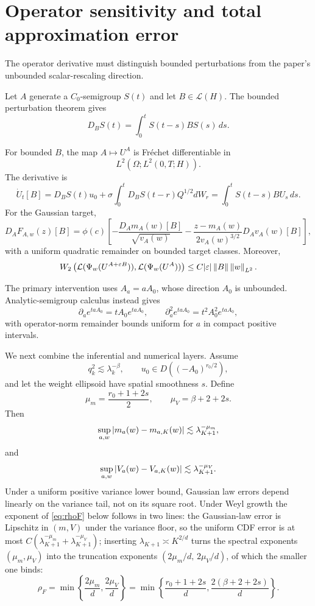 \section{Operator sensitivity and total approximation error}\label{sec:sensitivity}

The operator derivative must distinguish bounded perturbations from the paper's unbounded scalar-rescaling direction.

Let $A$ generate a $C_0$-semigroup $S(t)$ and let $B\in\mathcal L(H)$. The bounded perturbation theorem \citep{EngelNagel2000,Pazy1983} gives
\[
 D_BS(t)=\int_0^tS(t-s)BS(s)\,ds.
\]

\begin{theorem}\label{thm:sensitivity}
For bounded $B$, the map $A\mapsto U^A$ is Fr\'echet differentiable in
\[
 L^2(\Omega;L^2(0,T;H)).
\]
The derivative is
\[
 \dot U_t[B]
 =D_BS(t)u_0
 +\sigma\int_0^tD_BS(t-r)Q^{1/2}dW_r
 =\int_0^tS(t-s)BU_s\,ds.
\]
For the Gaussian target,
\[
 D_AF_{A,w}(z)[B]
 =\phi(c)
 \left[
 -\frac{D_Am_A(w)[B]}{\sqrt{v_A(w)}}
 -\frac{z-m_A(w)}{2v_A(w)^{3/2}}D_Av_A(w)[B]
 \right],
\]
with a uniform quadratic remainder on bounded target classes. Moreover,
\[
 W_2\left(
 \mathcal L(\Psi_w(U^{A+\varepsilon B})),
 \mathcal L(\Psi_w(U^A))
 \right)
 \le C|\varepsilon|\left\lVert B\right\rVert\left\lVert w\right\rVert_{L^2}.
\]
\end{theorem}

The primary intervention uses $A_a=aA_0$, whose direction $A_0$ is unbounded. Analytic-semigroup calculus instead gives
\[
 \partial_a e^{taA_0}=tA_0e^{taA_0},
 \qquad
 \partial_a^2e^{taA_0}=t^2A_0^2e^{taA_0},
\]
with operator-norm remainder bounds uniform for $a$ in compact positive intervals.

We next combine the inferential and numerical layers. Assume
\[
 q_k^2\lesssim\lambda_k^{-\beta},
 \qquad
 u_0\in D((-A_0)^{r_0/2}),
\]
and let the weight ellipsoid have spatial smoothness $s$. Define
\[
 \mu_m=\frac{r_0+1+2s}{2},
 \qquad
 \mu_V=\beta+2+2s.
\]
Then
\[
 \sup_{a,w}\left\lvert m_a(w)-m_{a,K}(w)\right\rvert
 \lesssim\lambda_{K+1}^{-\mu_m},
\]
and
\[
 \sup_{a,w}\left\lvert V_a(w)-V_{a,K}(w)\right\rvert
 \lesssim\lambda_{K+1}^{-\mu_V}.
\]
Under a uniform positive variance lower bound, Gaussian law errors depend linearly on the variance tail, not on its square root. Under Weyl growth the exponent of \eqref{eq:rhoF} below follows in two lines: the Gaussian-law error is Lipschitz in $(m,V)$ under the variance floor, so the uniform CDF error is at most $C(\lambda_{K+1}^{-\mu_m}+\lambda_{K+1}^{-\mu_V})$; inserting $\lambda_{K+1}\asymp K^{2/d}$ turns the spectral exponents $(\mu_m,\mu_V)$ into the truncation exponents $(2\mu_m/d,\,2\mu_V/d)$, of which the smaller one binds:
\begin{equation}\label{eq:rhoF}
 \rho_F
 =\min\left\{
 \frac{2\mu_m}{d},\frac{2\mu_V}{d}
 \right\}
 =\min\left\{
 \frac{r_0+1+2s}{d},
 \frac{2(\beta+2+2s)}{d}
 \right\}.
\end{equation}

